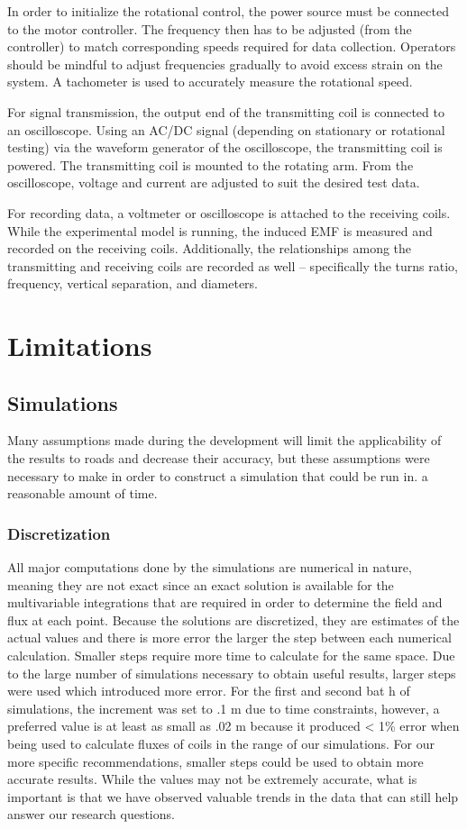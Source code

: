 In order to initialize the rotational control, the power source must be connected to the motor controller. 
The frequency then has to be adjusted (from the controller) to match corresponding speeds required for data collection. 
Operators should be mindful to adjust frequencies gradually to avoid excess strain on the system. 
A tachometer is used to accurately measure the rotational speed.

For signal transmission, the output end of the transmitting coil is connected to an oscilloscope. 
Using an AC/DC signal (depending on stationary or rotational testing) via the waveform generator of the oscilloscope, 
the transmitting coil is powered. The transmitting coil is mounted to the rotating arm. 
From the oscilloscope, voltage and current are adjusted to suit the desired test data.

For recording data, a voltmeter or oscilloscope is attached to the receiving coils. 
While the experimental model is running, the induced EMF is measured and recorded on the receiving coils. 
Additionally, the relationships among the transmitting and receiving coils are recorded as well – specifically 
the turns ratio, frequency, vertical separation, and diameters.

\section{Limitations}

\subsection{Simulations}
Many assumptions made during the development will limit the applicability of the results to roads and 
decrease their accuracy, but these assumptions were necessary to make in order to construct a simulation 
that could be run in. a reasonable amount of time.

\subsubsection{Discretization}
All major computations done by the simulations are numerical in nature, meaning they are not exact since an 
exact solution is available for the multivariable integrations that are required in order to determine the 
field and flux at each point. Because the solutions are discretized, they are estimates of the actual values 
and there is more error the larger the step between each numerical calculation. Smaller steps require more 
time to calculate for the same space. Due to the large number of simulations necessary to obtain useful results, 
larger steps were used which introduced more error.  For the first and second bat h of simulations, 
the increment was set to .1 m due to time constraints, however, a preferred value is at least as small as 
.02 m because it produced < 1\% error when being used to calculate fluxes of coils in the range of our simulations. 
For our more specific recommendations, smaller steps could be used to obtain more accurate results. 
While the values may not be extremely accurate, what is important is that we have observed valuable 
trends in the data that can still help answer our research questions. 

